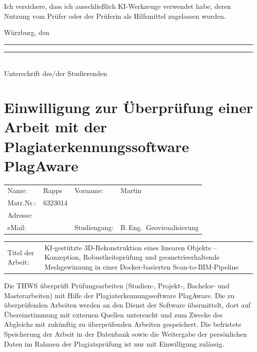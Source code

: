 \documentclass[12pt,a4paper]{article}
\newif\ifanonym
\begin{document}
Ich versichere, dass ich ausschließlich KI-Werkzeuge verwendet habe, deren
Nutzung vom Prüfer oder der Prüferin als Hilfsmittel zugelassen wurden.

\vfill
\noindent Würzburg, den \rule{4cm}{0.4pt}\hfill
\rule{6cm}{0.4pt}\\
\hfill Unterschrift des/der Studierenden
\clearpage
\ifanonym\else
\section*{Einwilligung zur Überprüfung einer Arbeit mit der
Plagiaterkennungssoftware PlagAware}

\vspace{0.5em}
\noindent\begin{tabular}{@{}p{2.2cm}p{4.4cm}p{1.8cm}l@{}}
Name: & Rapps & Vorname: & Martin\\[0.4em]
Matr.Nr.: & 6323014 & & \\[0.4em]
Adresse: & \dotfill & & \\[0.4em]
eMail: & \dotfill & Studiengang: & B.\,Eng.\ Geovisualisierung\\
\end{tabular}

\vspace{0.4em}
\noindent\begin{tabular}{@{}p{2.2cm}p{10.8cm}@{}}
Titel der Arbeit: & KI-gestützte 3D-Rekonstruktion eines linearen Objekts --
Konzeption, Robustheitsprüfung und geometrieerhaltende Meshgewinnung in einer
Docker-basierten Scan-to-BIM-Pipeline\\
\end{tabular}

\vspace{0.8em}
Die THWS überprüft Prüfungsarbeiten (Studien-, Projekt-, Bachelor- und
Masterarbeiten) mit Hilfe der Plagiaterkennungssoftware PlagAware. Die zu
überprüfenden Arbeiten werden an den Dienst der Software übermittelt, dort auf
Übereinstimmung mit externen Quellen untersucht und zum Zwecke des Abgleichs
mit zukünftig zu überprüfenden Arbeiten gespeichert. Die befristete Speicherung
der Arbeit in der Datenbank sowie die Weitergabe der persönlichen Daten im
Rahmen der Plagiatsprüfung ist nur mit Einwilligung zulässig.

\vspace{0.4em}
\noindent{}
\end{document}
